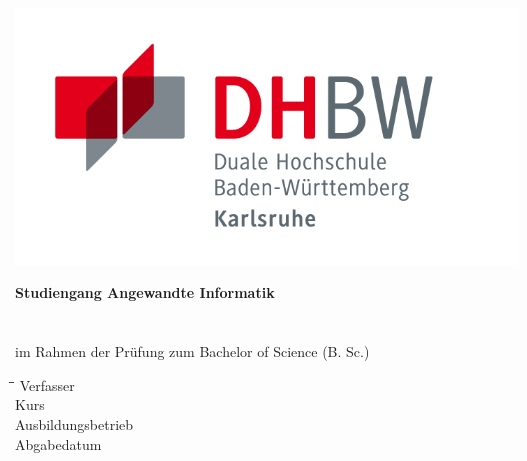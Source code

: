 \thispagestyle{plain}
\begin{titlepage}

\begin{center}
\includegraphics[scale=1.4]{Bilder/dhbw_large.jpg}

\large{\textbf{Studiengang Angewandte Informatik}}\\[6ex]

\huge{\textsc{\textbf{\titel}}}\\[4.5ex]

\large{\textbf{\art}}\\[0ex]
\large{im Rahmen der Pr\"ufung zum Bachelor of Science (B. Sc.)}\\[25mm]

\normalsize
\begin{tabbing}
\hspace*{3cm}\=\hspace*{6cm}\=\hspace{6cm}\=\kill
\>Verfasser \>\autor\\
\>Kurs \>\kursbez\\
\>Ausbildungsbetrieb \>\firmenname\\
\>Abgabedatum \>\abgabedatum\\
\end{tabbing}
\end{center}
\end{titlepage}
